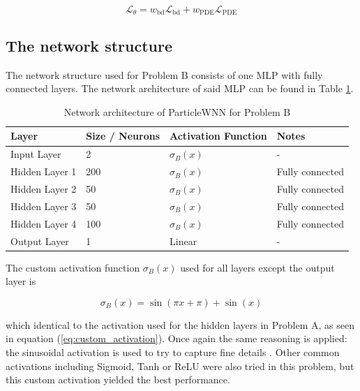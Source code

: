 \begin{equation}
	\mathcal{L}_\theta = w_\mathrm{bd} \mathcal{L}_\mathrm{bd} + w_\mathrm{PDE} \mathcal{L}_\mathrm{PDE}
\end{equation}






\subsection{The network structure}
%

The network structure used for Problem B consists of one MLP with fully connected layers. The network architecture of said MLP can be found in Table \ref{tab:problem_B_network}.


\begin{table}[H]
	\centering
	\caption{Network architecture of ParticleWNN for Problem B}
	\label{tab:problem_B_network}
	\begin{tabular}{llll}
		\hline
		\textbf{Layer} & \textbf{Size / Neurons} & \textbf{Activation Function} & \textbf{Notes} \\
		\hline
		Input Layer        & 2                                & $\sigma_B(x)$         & - \\
		Hidden Layer 1     & 200                              & $\sigma_B(x)$       & Fully connected \\
		Hidden Layer 2     & 50                               & $\sigma_B(x)$       & Fully connected \\
		Hidden Layer 3     & 50                               & $\sigma_B(x)$       & Fully connected \\
		Hidden Layer 4       & 100                            & $\sigma_B(x)$    & Fully connected \\
		Output Layer       & 1                              & Linear       & - \\
		\hline
	\end{tabular}
\end{table}

The custom activation function $\sigma_B(x)$ used for all layers except the output layer is

\begin{equation}
	\sigma_B(x) = \sin(\pi x + \pi) + \sin(x)
\end{equation}

\noindent
which identical to the activation used for the hidden layers in Problem A, as seen in equation (\ref{eq:custom_activation}). Once again the same reasoning is applied: the sinusoidal activation is used to try to capture fine details \cite{sitzmann2020implicitneuralrepresentationsperiodic}. Other common activations including Sigmoid, Tanh or ReLU were also tried in this problem, but this custom activation yielded the best performance.

